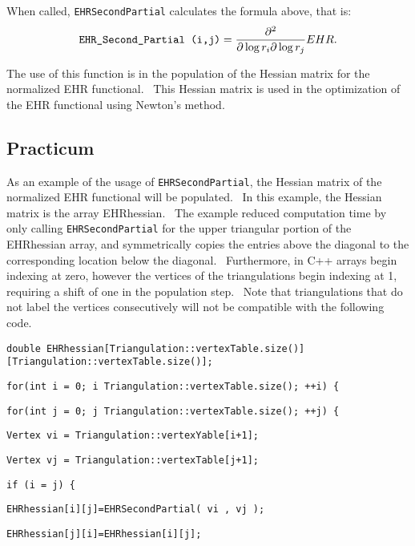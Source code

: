 When called, \texttt{EHRSecondPartial} calculates the formula above, that is:%
\begin{equation*}
\text{\texttt{EHR\_Second\_Partial (i,j)}}=\frac{\partial ^{2}}{\partial
\log r_{i}\partial \log r_{j}}EHR.
\end{equation*}

The use of this function is in the population of the Hessian matrix for the
normalized EHR functional. \ This Hessian matrix is used in the optimization
of the EHR functional using Newton's method.

\subsection*{Practicum}

As an example of the usage of \texttt{EHRSecondPartial}, the Hessian matrix
of the normalized EHR functional will be populated. \ In this example, the
Hessian matrix is the array EHRhessian. \ The example reduced computation
time by only calling \texttt{EHRSecondPartial} for the upper triangular
portion of the EHRhessian array, and symmetrically copies the entries above
the diagonal to the corresponding location below the diagonal. \
Furthermore, in C++ arrays begin indexing at zero, however the vertices of
the triangulations begin indexing at 1, requiring a shift of one in the
population step. \ Note that triangulations that do not label the vertices
consecutively will not be compatible with the following code. \ 

\bigskip

\qquad\texttt{double
EHRhessian[Triangulation::vertexTable.size()][Triangulation::vertexTable.size()];%
}

\qquad\texttt{for(int i = 0; i \TEXTsymbol{<}
Triangulation::vertexTable.size(); ++i) \{}

\qquad \qquad \texttt{for(int j = 0; j \TEXTsymbol{<}
Triangulation::vertexTable.size(); ++j) \{}

\qquad \qquad \qquad \texttt{Vertex vi = Triangulation::vertexYable[i+1];}

\qquad \qquad \qquad \texttt{Vertex vj = Triangulation::vertexTable[j+1];}

\qquad \qquad \qquad \texttt{if (i \TEXTsymbol{<}= j) \{}

\qquad \qquad \qquad \qquad \texttt{EHRhessian[i][j]=EHRSecondPartial( vi ,
vj );}

\qquad\qquad\qquad\qquad\texttt{EHRhessian[j][i]=EHRhessian[i][j];}

